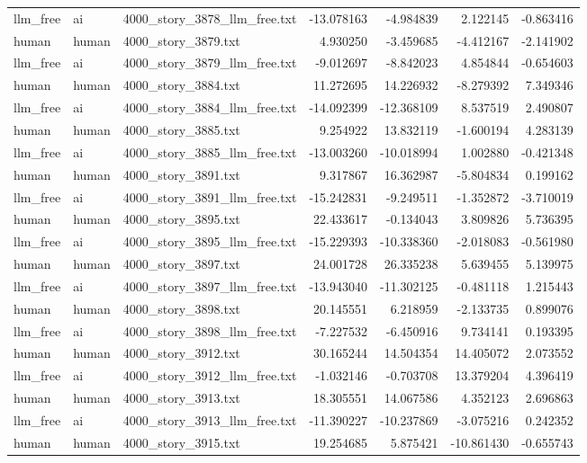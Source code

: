 \begin{longtable}{lllrrrr}
llm\_free & ai & 4000\_story\_3878\_llm\_free.txt & -13.078163 & -4.984839 & 2.122145 & -0.863416 \\
human & human & 4000\_story\_3879.txt & 4.930250 & -3.459685 & -4.412167 & -2.141902 \\
llm\_free & ai & 4000\_story\_3879\_llm\_free.txt & -9.012697 & -8.842023 & 4.854844 & -0.654603 \\
human & human & 4000\_story\_3884.txt & 11.272695 & 14.226932 & -8.279392 & 7.349346 \\
llm\_free & ai & 4000\_story\_3884\_llm\_free.txt & -14.092399 & -12.368109 & 8.537519 & 2.490807 \\
human & human & 4000\_story\_3885.txt & 9.254922 & 13.832119 & -1.600194 & 4.283139 \\
llm\_free & ai & 4000\_story\_3885\_llm\_free.txt & -13.003260 & -10.018994 & 1.002880 & -0.421348 \\
human & human & 4000\_story\_3891.txt & 9.317867 & 16.362987 & -5.804834 & 0.199162 \\
llm\_free & ai & 4000\_story\_3891\_llm\_free.txt & -15.242831 & -9.249511 & -1.352872 & -3.710019 \\
human & human & 4000\_story\_3895.txt & 22.433617 & -0.134043 & 3.809826 & 5.736395 \\
llm\_free & ai & 4000\_story\_3895\_llm\_free.txt & -15.229393 & -10.338360 & -2.018083 & -0.561980 \\
human & human & 4000\_story\_3897.txt & 24.001728 & 26.335238 & 5.639455 & 5.139975 \\
llm\_free & ai & 4000\_story\_3897\_llm\_free.txt & -13.943040 & -11.302125 & -0.481118 & 1.215443 \\
human & human & 4000\_story\_3898.txt & 20.145551 & 6.218959 & -2.133735 & 0.899076 \\
llm\_free & ai & 4000\_story\_3898\_llm\_free.txt & -7.227532 & -6.450916 & 9.734141 & 0.193395 \\
human & human & 4000\_story\_3912.txt & 30.165244 & 14.504354 & 14.405072 & 2.073552 \\
llm\_free & ai & 4000\_story\_3912\_llm\_free.txt & -1.032146 & -0.703708 & 13.379204 & 4.396419 \\
human & human & 4000\_story\_3913.txt & 18.305551 & 14.067586 & 4.352123 & 2.696863 \\
llm\_free & ai & 4000\_story\_3913\_llm\_free.txt & -11.390227 & -10.237869 & -3.075216 & 0.242352 \\
human & human & 4000\_story\_3915.txt & 19.254685 & 5.875421 & -10.861430 & -0.655743 \\

\end{longtable}
